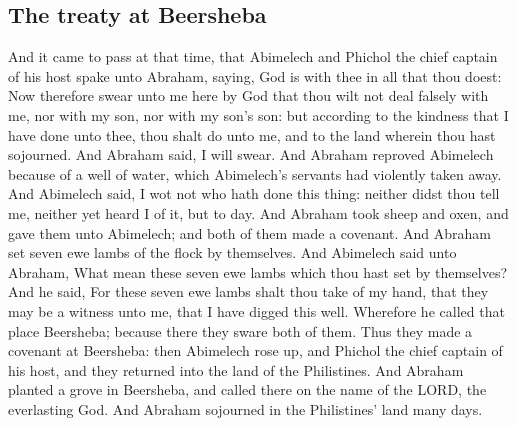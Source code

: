 \begin{biblechapter}
\section*{The treaty at Beersheba}
\verse And it came to pass at that time, that Abimelech and Phichol the chief captain of his host spake unto Abraham, saying, God is with thee in all that thou doest:
\verse Now therefore swear unto me here by God that thou wilt not deal falsely with me, nor with my son, nor with my son's son: but according to the kindness that I have done unto thee, thou shalt do unto me, and to the land wherein thou hast sojourned.
\verse And Abraham said, I will swear.
\verse And Abraham reproved Abimelech because of a well of water, which Abimelech's servants had violently taken away.
\verse And Abimelech said, I wot not who hath done this thing: neither didst thou tell me, neither yet heard I of it, but to day.
\verse And Abraham took sheep and oxen, and gave them unto Abimelech; and both of them made a covenant.
\verse And Abraham set seven ewe lambs of the flock by themselves.
\verse And Abimelech said unto Abraham, What mean these seven ewe lambs which thou hast set by themselves?
\verse And he said, For these seven ewe lambs shalt thou take of my hand, that they may be a witness unto me, that I have digged this well.
\verse Wherefore he called that place Beersheba; because there they sware both of them.
\verse Thus they made a covenant at Beersheba: then Abimelech rose up, and Phichol the chief captain of his host, and they returned into the land of the Philistines.
\verse And Abraham planted a grove in Beersheba, and called there on the name of the LORD, the everlasting God.
\verse And Abraham sojourned in the Philistines' land many days.
\end{biblechapter}

